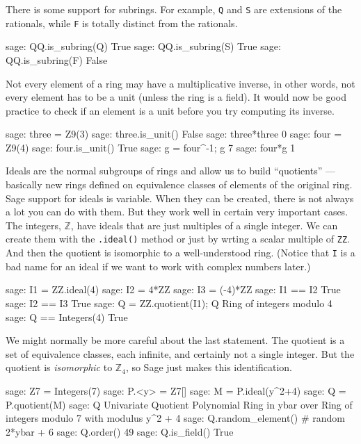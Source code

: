 %
There is some support for subrings.  For example, \verb?Q? and \verb?S? are extensions of the rationals, while \verb?F? is totally distinct from the rationals.
%
\begin{sageexample}
sage: QQ.is_subring(Q)
True
sage: QQ.is_subring(S)
True
sage: QQ.is_subring(F)
False
\end{sageexample}
%
Not every element of a ring may have a multiplicative inverse, in other words, not every element has to be a unit (unless the ring is a field).  It would now be good practice to check if an element is a unit before you try computing its inverse.
%
\begin{sageexample}
sage: three = Z9(3)
sage: three.is_unit()
False
sage: three*three
0
sage: four = Z9(4)
sage: four.is_unit()
True
sage: g = four^-1; g
7
sage: four*g
1
\end{sageexample}
%
%
Ideals are the normal subgroups of rings and allow us to build ``quotients'' --- basically new rings defined on equivalence classes of elements of the original ring.  Sage support for ideals is variable.  When they can be created, there is not always a lot you can do with them.  But they work well in certain very important cases.
%
The integers, ${\mathbb Z}$, have ideals that are just multiples of a single integer.  We can create them with the \verb?.ideal()? method or just by wrting a scalar multiple of \verb?ZZ?.  And then the quotient is isomorphic to a well-understood ring.  (Notice that \verb?I? is a bad name for an ideal if we want to work with complex numbers later.)
%
\begin{sageexample}
sage: I1 = ZZ.ideal(4)
sage: I2 = 4*ZZ
sage: I3 = (-4)*ZZ
sage: I1 == I2
True
sage: I2 == I3
True
sage: Q = ZZ.quotient(I1); Q
Ring of integers modulo 4
sage: Q == Integers(4)
True
\end{sageexample}
%
We might normally be more careful about the last statement.  The quotient is a set of equivalence classes, each infinite, and certainly not a single integer.  But the quotient is \emph{isomorphic} to ${\mathbb Z}_4$, so Sage just makes this identification.\par
%
\begin{sageexample}
sage: Z7 = Integers(7)
sage: P.<y> = Z7[]
sage: M = P.ideal(y^2+4)
sage: Q = P.quotient(M)
sage: Q
Univariate Quotient Polynomial Ring in ybar over
Ring of integers modulo 7 with modulus y^2 + 4
sage: Q.random_element() # random
2*ybar + 6
sage: Q.order()
49
sage: Q.is_field()
True
\end{sageexample}
